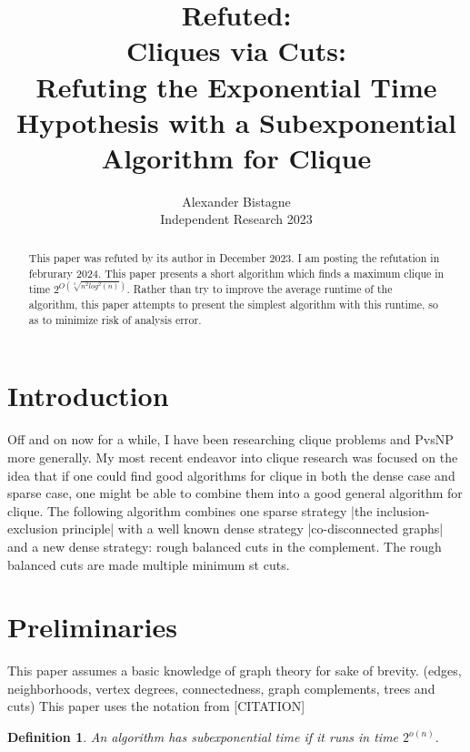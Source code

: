 \documentclass[12pt]{article}
\newtheorem{mydef}[thm]{Definition}
\begin{document}
\title{Refuted: \\Cliques via Cuts: \\ Refuting the Exponential Time Hypothesis with a Subexponential Algorithm for Clique}

\author{Alexander Bistagne \\ 
Independent Research 2023}

\maketitle

\begin{abstract}
  This paper was refuted by its author in December 2023. I am posting the refutation in februrary 2024.
  This paper presents a short algorithm which finds a maximum clique in time $2^{ O(\sqrt[3]{n^2log^2(n)}) } $. Rather than try to improve the average runtime of the algorithm, this paper attempts to present the simplest algorithm with this runtime, so as to minimize risk of analysis error.

\end{abstract}


\section{Introduction}
Off and on now for a while, I have been researching clique problems and PvsNP more generally. My most recent endeavor into clique research was focused on the idea that if one could find good algorithms for clique in both the dense case and sparse case, one might be able to combine them into a good general algorithm for clique. The following algorithm combines one sparse strategy |the inclusion-exclusion principle| with a well known dense strategy |co-disconnected graphs| and a new dense strategy: rough balanced cuts in the complement. The rough balanced cuts are made multiple minimum st cuts.

\section{Preliminaries}

This paper assumes a basic knowledge of graph theory for sake of brevity. (edges, neighborhoods, vertex degrees, connectedness, graph complements, trees and cuts) This paper uses the notation from [CITATION]

\begin{mydef} An algorithm has subexponential time if it runs in time $2^{o(n)}$. \end{mydef}
\end{document}
